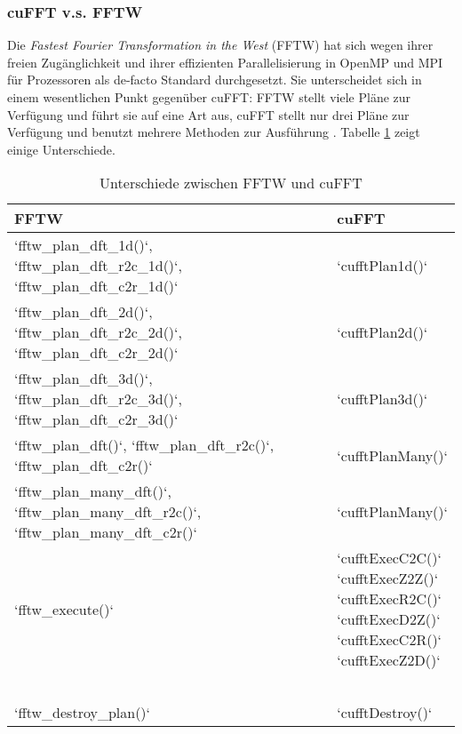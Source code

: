 		 	\subsubsection{cuFFT v.s. FFTW}\label{fftw}
		 	Die \textit{Fastest Fourier Transformation in the West} (FFTW) hat sich wegen ihrer freien Zugänglichkeit und ihrer effizienten Parallelisierung in OpenMP und MPI für Prozessoren als de-facto Standard durchgesetzt. Sie unterscheidet sich in einem wesentlichen Punkt gegenüber cuFFT: FFTW stellt viele Pläne zur Verfügung und führt sie auf eine Art aus, cuFFT stellt nur drei Pläne zur Verfügung und benutzt mehrere Methoden zur Ausführung \autocite{FFTW05}. Tabelle \ref{tab6:fftw} zeigt einige Unterschiede.
		 	\begin{table}[h]
		 	\centering
		 	\begin{tabular}{ll}
		 		\toprule
		 		FFTW & cuFFT \\ \midrule
		 		\li`fftw_plan_dft_1d()`, \li`fftw_plan_dft_r2c_1d()`, \li`fftw_plan_dft_c2r_1d()` & \li`cufftPlan1d()` \\
		 		\li`fftw_plan_dft_2d()`, \li`fftw_plan_dft_r2c_2d()`, \li`fftw_plan_dft_c2r_2d()` & \li`cufftPlan2d()` \\
		 		\li`fftw_plan_dft_3d()`, \li`fftw_plan_dft_r2c_3d()`, \li`fftw_plan_dft_c2r_3d()` & \li`cufftPlan3d()` \\
		 		\li`fftw_plan_dft()`, \li`fftw_plan_dft_r2c()`, \li`fftw_plan_dft_c2r()` & \li`cufftPlanMany()` \\
		 		\li`fftw_plan_many_dft()`, \li`fftw_plan_many_dft_r2c()`, \li`fftw_plan_many_dft_c2r()` & \li`cufftPlanMany()` \\
		 		\li`fftw_execute()` & \multirowcell{6}{\li`cufftExecC2C()`\\ \li`cufftExecZ2Z()`\\ \li`cufftExecR2C()`\\ \li`cufftExecD2Z()`\\ \li`cufftExecC2R()`\\ \li`cufftExecZ2D()`} \\
		 		& \\
		 		& \\
		 		& \\
		 		& \\
		 		& \\
		 		\li`fftw_destroy_plan()` & \li`cufftDestroy()` \\ \bottomrule
		 	\end{tabular}
		 	\caption[cuFFT v.s. FFTW]{Unterschiede zwischen FFTW und cuFFT}
		 	\label{tab6:fftw}
		 	\end{table}
		 	
